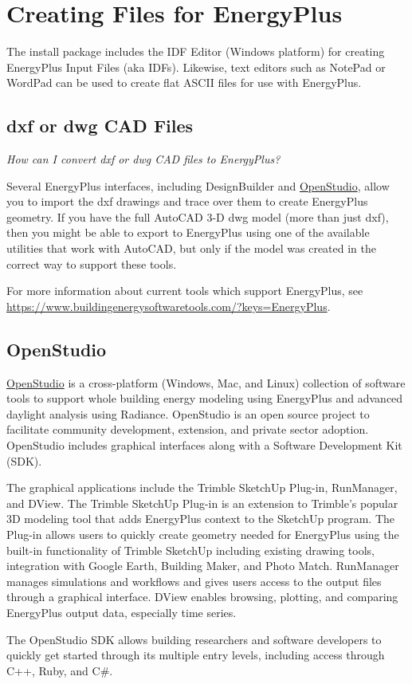 \section{Creating Files for EnergyPlus}\label{creating-files-for-energyplus}

The install package includes the IDF Editor (Windows platform) for creating EnergyPlus Input Files (aka IDFs).
Likewise, text editors such as NotePad or WordPad can be used to create flat ASCII files for use with EnergyPlus.

\subsection{dxf or dwg CAD Files}\label{dxf-or-dwg-cad-files}

\emph{How can I convert dxf or dwg CAD files to EnergyPlus?}

Several EnergyPlus interfaces, including DesignBuilder and \href{https://www.openstudio.net/}{OpenStudio}, allow you to import the dxf drawings and trace over them to create EnergyPlus geometry. If you have the full AutoCAD 3-D dwg model (more than just dxf), then you might be able to export to EnergyPlus using one of the available utilities that work with AutoCAD, but only if the model was created in the correct way to support these tools.

For more information about current tools which support EnergyPlus, see \url{https://www.buildingenergysoftwaretools.com/?keys=EnergyPlus}.

\subsection{OpenStudio}\label{openstudio}

\href{https://www.openstudio.net/}{OpenStudio} is a cross-platform (Windows, Mac, and Linux) collection of software tools to support whole building energy modeling using EnergyPlus and advanced daylight analysis using Radiance. OpenStudio is an open source project to facilitate community development, extension, and private sector adoption. OpenStudio includes graphical interfaces along with a Software Development Kit (SDK).

The graphical applications include the Trimble SketchUp Plug-in, RunManager, and DView.
The Trimble SketchUp Plug-in is an extension to Trimble’s popular 3D modeling tool that adds EnergyPlus context to the SketchUp program.
The Plug-in allows users to quickly create geometry needed for EnergyPlus using the built-in functionality of Trimble SketchUp including existing drawing tools, integration with Google Earth, Building Maker, and Photo Match.
RunManager manages simulations and workflows and gives users access to the output files through a graphical interface.
DView enables browsing, plotting, and comparing EnergyPlus output data, especially time series.

The OpenStudio SDK allows building researchers and software developers to quickly get started through its multiple entry levels, including access through C++, Ruby, and C#.
